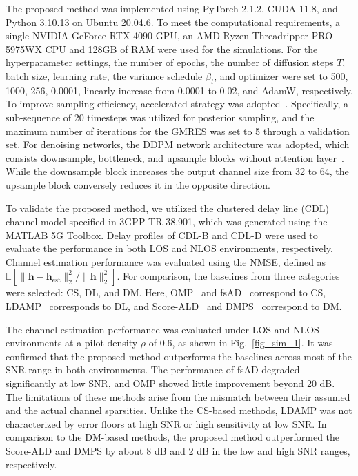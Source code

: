 \documentclass[lettersize,journal]{IEEEtran}
\newcommand{\tred}{\textcolor{red}}
\begin{document}
The proposed method was implemented using PyTorch 2.1.2, CUDA 11.8, and Python 3.10.13 on Ubuntu 20.04.6. To meet the computational requirements, a single NVIDIA GeForce RTX 4090 GPU, an AMD Ryzen Threadripper PRO 5975WX CPU and 128GB of RAM were used for the simulations. For the hyperparameter settings, the number of epochs, the number of diffusion steps $T$, batch size, learning rate, the variance schedule $\beta_{t}$, and optimizer were set to 500, 1000, 256, 0.0001, linearly increase from 0.0001 to 0.02, and AdamW, respectively.
To improve sampling efficiency, accelerated strategy was adopted~\cite{songDenoisingDiffusionImplicit2020}. Specifically, a sub-sequence of 20 timesteps was utilized for posterior sampling, and the maximum number of iterations for the GMRES was set to 5 through a validation set. For denoising networks, the DDPM network architecture was adopted, which consists downsample, bottleneck, and upsample blocks without attention layer~\cite{hoDenoisingDiffusionProbabilistic2020}. While the downsample block increases the output channel size from 32 to 64, the upsample block conversely reduces it in the opposite direction.

To validate the proposed method, we utilized the clustered delay line (CDL)
channel model specified in 3GPP TR 38.901, which was generated using the MATLAB 5G Toolbox. Delay profiles of CDL-B and CDL-D were used to evaluate the performance in both LOS and NLOS environments, respectively. Channel estimation performance was evaluated using the NMSE, defined as $\mathbb{E}[\|\mathbf{h}-\mathbf{h}_{\text{est}}\|_{2}^{2} / \|\mathbf{h}\|_{2}^{2}]$. For comparison, the baselines from three categories were selected: CS, DL, and DM. Here, OMP~\cite{zhangAtomicNormDenoisingBased2018} and  fsAD~\cite{mendez-rialHybridMIMOArchitectures2016} correspond to CS, LDAMP~\cite{heDeepLearningBasedChannel2018} corresponds to DL, and Score-ALD~\cite{arvinteMIMOChannelEstimation2023} and DMPS~\cite{zhouGenerativeDiffusionModels2025} correspond to DM.


The channel estimation performance was evaluated under LOS and NLOS environments at a pilot density $\rho$ of 0.6, as shown in Fig.~\ref{fig_sim_1}. It was confirmed that the proposed method outperforms the baselines across most of the SNR range in both environments. The performance of fsAD degraded significantly at low SNR, and OMP showed little improvement beyond 20 dB. The limitations of these methods arise from the mismatch between their assumed
and the actual channel sparsities. Unlike the CS-based methods, LDAMP was not characterized by error floors at high SNR or high sensitivity at low SNR. In comparison to the DM-based methods, the proposed method outperformed the Score-ALD and DMPS by about 8 dB and 2 dB in the low and high SNR ranges, respectively.
\end{document}
